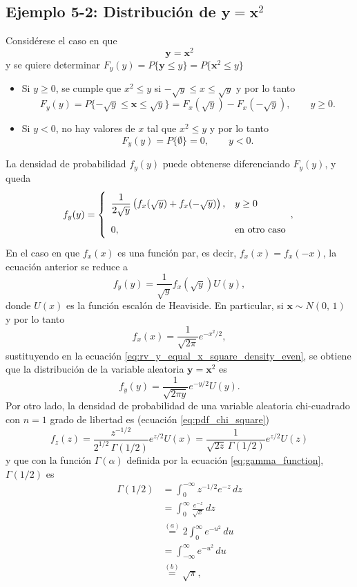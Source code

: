 \documentclass[a4paper]{report}
\newcommand{\x}{\mathbf{x}}
\newcommand{\y}{\mathbf{y}}
\begin{document}
\subsection{\texorpdfstring{Ejemplo 5-2: Distribución de \(\y=\x^2\)}{}}\label{sec:x_square_distribution}

Considérese el caso en que
\[
 \y=\x^2
\]
y se quiere determinar \(F_y(y)=P\{\y\leq y\}=P\{\x^2\leq y\}\)
\begin{itemize}
 \item Si \(y\geq 0\), se cumple que \(x^2\leq y\) si \(-\sqrt{y}\leq x\leq \sqrt{y}\) y por lo tanto
 \[
  F_y(y)=P\{-\sqrt{y}\leq \x\leq \sqrt{y}\}=F_x(\sqrt{y})-F_x(-\sqrt{y}), \qquad y\geq0.
 \]
 \item Si \(y<0\), no hay valores de \(x\) tal que \(x^2\leq y\) y por lo tanto
 \[
  F_y(y)=P\{\emptyset\}=0,\qquad y<0.
 \]
\end{itemize}
La densidad de probabilidad \(f_y(y)\) puede obtenerse diferenciando \(F_y(y)\), y queda
\[
\def\arraystretch{2.0}
 f_y(y)=
 \left\{\begin{array}{ll}
  \dfrac{1}{2\sqrt{y}}\left(f_x(\sqrt{y})+f_x(-\sqrt{y})\right), & y\geq 0\\
  0, & \textrm{en otro caso}
 \end{array}, \right.
\]
En el caso en que \(f_x(x)\) es una función par, es decir, \(f_x(x)=f_x(-x)\), la ecuación anterior se reduce a
\begin{equation}\label{eq:rv_y_equal_x_square_density_even}
 f_y(y)=\frac{1}{\sqrt{y}}f_x(\sqrt{y})U(y),
\end{equation}
donde \(U(x)\) es la función escalón de Heaviside. En particular, si \(\x\sim N(0,\,1)\) y por lo  tanto
\[
 f_x(x)=\frac{1}{\sqrt{2\pi}}e^{-x^2/2},
\]
sustituyendo en la ecuación \ref{eq:rv_y_equal_x_square_density_even}, se obtiene que la distribución de la variable aleatoria \(\y=\x^2\) es
\begin{equation}\label{eq:rv_x_square_normal_density}
 f_y(y)=\frac{1}{\sqrt{2\pi y}}e^{-y/2}U(y).
\end{equation}
Por otro lado, la densidad de probabilidad de una variable aleatoria chi-cuadrado con \(n=1\) grado de libertad es (ecuación \ref{eq:pdf_chi_square})
\[
 f_z(z)=\frac{z^{-1/2}}{2^{1/2}\,\Gamma(1/2)} e^{z/2}U(x)=\frac{1}{\sqrt{2z}\,\Gamma(1/2)} e^{z/2}U(z)
\]
y que con la función \(\Gamma(\alpha)\) definida por la ecuación \ref{eq:gamma_function}, \(\Gamma(1/2)\) es  
\begin{align*}
 \Gamma(1/2)&=\int_{0}^{-\infty}z^{-1/2}e^{-z}\,dz\\
    &=\int_{0}^{\infty}\frac{e^{-z}}{\sqrt{x}}\,dz\\
    &\overset{(a)}{=}2\int_{0}^{\infty}e^{-u^2}\,du\\
    &=\int_{-\infty}^{\infty}e^{-u^2}\,du\\
    &\overset{(b)}{=}\sqrt{\pi},
\end{align*}
\end{document}
